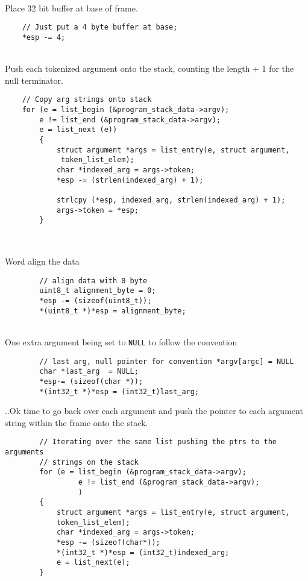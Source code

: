 \documentclass[]{article}
\begin{document}
	\newpage
	\textbf{}\\
	Place 32 bit buffer at base of frame.
	
	\lstset{language=C,tabsize=2}
    \begin{lstlisting}
	// Just put a 4 byte buffer at base;
	*esp -= 4;
	\end{lstlisting}
	\texttt{}\\
	Push each tokenized argument onto the stack, counting the length + 1 for the null terminator.

	\lstset{language=C,tabsize=2}
    \begin{lstlisting}
	// Copy arg strings onto stack
	for (e = list_begin (&program_stack_data->argv);
		e != list_end (&program_stack_data->argv);
		e = list_next (e))
		{
		    struct argument *args = list_entry(e, struct argument,
		     token_list_elem);
		    char *indexed_arg = args->token;
		    *esp -= (strlen(indexed_arg) + 1);

		    strlcpy (*esp, indexed_arg, strlen(indexed_arg) + 1);
		    args->token = *esp;
		}
		
	\end{lstlisting}
	\textbf{}\\
	Word align the data
	
		\lstset{language=C,tabsize=2}
    \begin{lstlisting}
		// align data with 0 byte 
		uint8_t alignment_byte = 0;
		*esp -= (sizeof(uint8_t));
		*(uint8_t *)*esp = alignment_byte;
	\end{lstlisting}
	\textbf{}\\
	One extra argument being set to \texttt{NULL} to follow the convention\\
		\lstset{language=C,tabsize=2}
    \begin{lstlisting}
		// last arg, null pointer for convention *argv[argc] = NULL
		char *last_arg  = NULL;
		*esp-= (sizeof(char *));
		*(int32_t *)*esp = (int32_t)last_arg;    
	\end{lstlisting}
	\newpage
	..Ok time to go back over each argument and push the pointer to each argument string within the frame onto the stack.
	
	
		\lstset{language=C,tabsize=2}
    \begin{lstlisting}
		// Iterating over the same list pushing the ptrs to the arguments 
		// strings on the stack
		for (e = list_begin (&program_stack_data->argv);
				 e != list_end (&program_stack_data->argv);
				 )
		{
			struct argument *args = list_entry(e, struct argument, 
			token_list_elem);
			char *indexed_arg = args->token;
			*esp -= (sizeof(char*));
			*(int32_t *)*esp = (int32_t)indexed_arg;
			e = list_next(e);
		}

	\end{lstlisting}	
	
\end{document}
